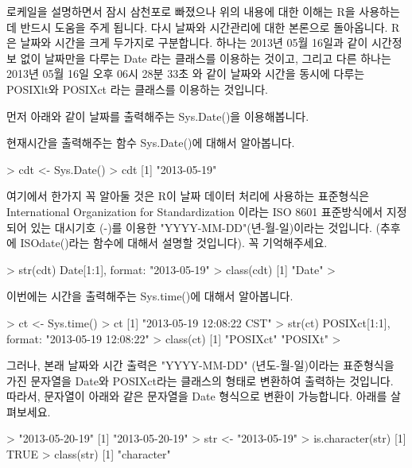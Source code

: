 \documentclass[tutorial.tex]{subfiles}
\begin{document}
로케일을 설명하면서 잠시 삼천포로 빠졌으나 위의 내용에 대한 이해는 R을 사용하는데 반드시 도움을 주게 됩니다. 
다시 날짜와 시간관리에 대한 본론으로 돌아옵니다.
R은 날짜와 시간을 크게 두가지로 구분합니다. 
하나는 2013년 05월 16일과 같이 시간정보 없이 날짜만을 다루는 Date 라는 클래스를 이용하는 것이고, 그리고 다른 하나는 2013년 05월 16일 오후 06시 28분 33초 와 같이 날짜와 시간을 동시에 다루는 POSIXlt와 POSIXct 라는 클래스를 이용하는 것입니다.

먼저 아래와 같이 날짜를 출력해주는 Sys.Date()을 이용해봅니다.

현재시간을 출력해주는 함수 Sys.Date()에 대해서 알아봅니다.
\begin{Schunk}
\begin{Soutput} 
> cdt <- Sys.Date()
> cdt
[1] "2013-05-19"
\end{Soutput}
\end{Schunk}

여기에서 한가지 꼭 알아둘 것은 R이 날짜 데이터 처리에 사용하는 표준형식은 International Organization for Standardization 이라는 ISO 8601 표준방식에서 지정되어 있는 대시기호 (-)를 이용한 "YYYY-MM-DD"(년-월-일)이라는 것입니다. 
(추후에 ISOdate()라는 함수에 대해서 설명할 것입니다).
꼭 기억해주세요.

\begin{Schunk}
\begin{Soutput} 
> str(cdt)
 Date[1:1], format: "2013-05-19"
> class(cdt)
[1] "Date"
> 
\end{Soutput}
\end{Schunk}

이번에는 시간을 출력해주는 Sys.time()에 대해서 알아봅니다.

\begin{Schunk}
\begin{Soutput} 
> ct <- Sys.time()
> ct
[1] "2013-05-19 12:08:22 CST"
> str(ct)
 POSIXct[1:1], format: "2013-05-19 12:08:22"
> class(ct)
[1] "POSIXct" "POSIXt" 
>
\end{Soutput}
\end{Schunk}

그러나, 본래 날짜와 시간 출력은 "YYYY-MM-DD" (년도-월-일)이라는 표준형식을 가진 문자열을 Date와 POSIXct라는 클래스의 형태로 변환하여 출력하는 것입니다. 
따라서, 문자열이 아래와 같은 문자열을 Date 형식으로 변환이 가능합니다. 
아래를 살펴보세요. 

\begin{Schunk}
\begin{Soutput} 
> "2013-05-20-19"
[1] "2013-05-20-19"
> str <- "2013-05-19"
> is.character(str)
[1] TRUE
> class(str)
[1] "character"
\end{Soutput}
\end{Schunk}
\end{document}
